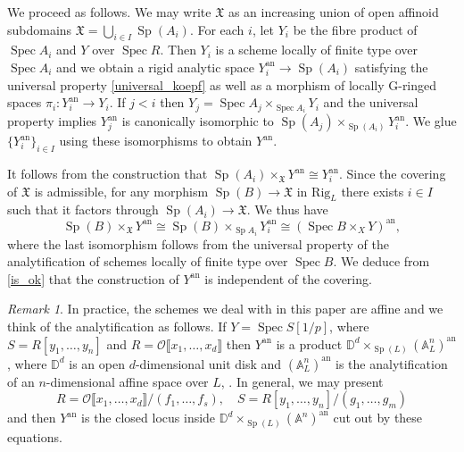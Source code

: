 \documentclass{amsart}
\theoremstyle{definition}
\theoremstyle{remark}
\newtheorem{remar}[prop]{Remark}
\DeclareMathOperator{\Spec}{Spec}
\DeclareMathOperator{\Sp}{Sp}
\newcommand{\OO}{\mathcal O}
\newcommand{\br}[1]{\llbracket #1\rrbracket}
\newcommand{\ana}{\mathrm{an}}
\newcommand{\Rig}{\mathrm{Rig}}
\begin{document}
We proceed as follows. 
We may write $\mathfrak X$ as an increasing 
union of  open affinoid
subdomains $\mathfrak X= \bigcup_{i\in I} \Sp(A_i)$.
For each $i$, let $Y_i$ be the fibre product 
of $\Spec A_i$ and $Y$ over $\Spec R$. Then $Y_i$ is a scheme 
locally of finite type over $\Spec A_i$ and we obtain 
a rigid analytic space $Y_i^{\ana}\rightarrow \Sp(A_i)$ satisfying the 
universal property \eqref{universal_koepf} as well as a morphism 
of locally G-ringed spaces $\pi_i: Y_i^{\ana}\rightarrow Y_i$. 
If $j<i$ then $Y_j = \Spec A_j \times_{\Spec A_i} Y_i$ and the universal property implies 
$Y_j^{\ana}$ is canonically isomorphic to 
$\Sp(A_j)\times_{\Sp(A_i)} Y_{i}^{\ana}$. 
We glue $\{Y_i^{\ana}\}_{i\in I}$ 
using these isomorphisms to obtain
$Y^{\ana}$. 

It follows from the construction that $\Sp(A_i)\times_{\mathfrak X} Y^{\ana}\cong Y_i^{\ana}$. 
Since the covering of $\mathfrak X$ is admissible, for any morphism 
$\Sp(B)\rightarrow \mathfrak X$ in $\Rig_L$ there exists $i\in I$ such that it factors 
through $\Sp(A_i)\rightarrow \mathfrak X$. We thus have 
\begin{equation}\label{is_ok}
\Sp(B)\times_{\mathfrak X} Y^{\ana}\cong \Sp(B)\times_{\Sp A_i} Y_i^{\ana}\cong (\Spec B \times_{X} Y)^{\ana},
\end{equation}
where the last isomorphism follows from the universal property of the 
analytification of schemes locally of finite type over $\Spec B$. We deduce from \eqref{is_ok} that the construction 
of $Y^{\ana}$ is independent of the covering. 

\begin{remar}
In practice, the schemes we deal with in this paper are affine and we think of the analytification as follows.  If $Y=\Spec S[1/p]$, where $S=R[y_1,\ldots, y_n]$ 
and $R=\OO\br{x_1,\ldots, x_d}$  then $Y^{\ana}$ is a product $\mathbb{D}^d \times_{\Sp(L)} (\mathbb A^n_L)^{\ana}$, where $\mathbb{D}^d$ is an open $d$-dimensional unit disk and $(\mathbb A^n_L)^{\ana}$ 
is the analytification of an $n$-dimensional affine space over $L$, 
\cite[Example 9.3.4/1]{BGR}. In general, we may present 
$$R=\OO\br{x_1, \ldots, x_d}/(f_1, \ldots, f_s), \quad S=R[y_1,\ldots, y_n]/(g_1,\ldots, g_m)$$ and then $Y^{\ana}$ 
is the closed locus inside $\mathbb{D}^d \times_{\Sp(L)} (\mathbb A^n)^{\ana}$ cut out by these equations. 
\end{remar}
\end{document}
